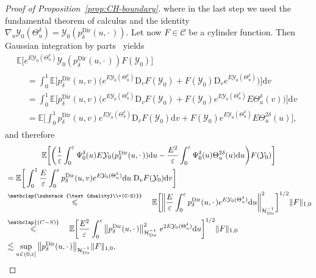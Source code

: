 \documentclass[10pt]{amsart}
\theoremstyle{definition}\newtheorem{defi}[theo]{Definition}\newtheorem{rema}[theo]{Remark}\newtheorem{exam}[theo]{Example}\newtheorem{exem}[theo]{Example}\newtheorem{nota}[theo]{Notation}
\DeclareMathOperator{\Dir}{Dir}
\newcommand{\bb}[1]{{\mathbb #1}}
\newcommand{\mc}[1]{{\mathcal #1}}
\renewcommand{\mc}[1]{{\mathcal #1}}
\newcommand{\mrD}{\mathrm{D}}
\renewcommand{\leq}{\leqslant}
\renewcommand{\le}{\leqslant}
\newcommand*{\dd}{\mathrm{d}}
\newcommand*{\du}{\dd u}
\newcommand*{\dv}{\dd v}
\begin{document}
\begin{proof}[Proof of Proposition~\ref{prop:CH-boundary}]
where in the last step we used the fundamental theorem of calculus and the identity $\nabla_u \mc Y_0(\Theta^\delta_u) = \mc Y_0(p^{\Dir}_\delta(u,\cdot\,))$. Let now $F \in \mc C$ be a cylinder function. Then Gaussian integration by parts~\cite[Lemma~1.2.1]{Nualart2006} yields
\begin{multline*}
\bb E\big[e^{E \mc Y_0(\Theta^\delta_u)} \mc Y_0(p^{\Dir}_\delta(u, \cdot\,)) F(\mc Y_0) \big] \\
\begin{aligned}
& = \int_0^1 \bb E\Big[p^{\Dir}_\delta(u,v) \big(e^{E \mc Y_0(\Theta^\delta_u)} \mrD_vF(\mc Y_0) + F(\mc Y_0) \mrD_v e^{E \mc Y_0(\Theta^\delta_u)} \big) \Big] \dv \\
& = \int_0^1 \bb E\Big[p^{\Dir}_\delta(u,v) \big(e^{E \mc Y_0(\Theta^\delta_u)} \mrD_vF(\mc Y_0) + F(\mc Y_0) e^{E \mc Y_0(\Theta^\delta_u)} E \Theta^\delta_u(v) \big) \Big] \dv \\
& = \bb E\bigg[\int_0^1 p^{\Dir}_\delta(u,v) e^{E \mc Y_0(\Theta^\delta_u)} \mrD_vF(\mc Y_0) \dv+ F(\mc Y_0) e^{E \mc Y_0(\Theta^\delta_u)} E \Theta^{2\delta}_u(u) \bigg],
\end{aligned}
\end{multline*}
and therefore
\begin{multline*}
\bb E\bigg[\bigg(\frac{1}{\varepsilon} \int_0^\varepsilon \Psi^\delta_0 (u) E \mc Y_0(p^{\Dir}_\delta(u,\cdot\,)) \du - \frac{E^2}{\varepsilon} \int_0^\varepsilon \Psi^\delta_0(u) \Theta^{2\delta}_u(u) \du\bigg) F(\mc Y_0) \bigg] \\
\begin{aligned}
&= \bb E\bigg[\int_0^1 \frac{E}{\varepsilon} \int_0^\varepsilon p^{\Dir}_\delta(u,v) e^{E \mc Y_0(\Theta^\delta_u)} \du\; \mrD_vF(\mc Y_0) \dv \bigg] \\
&\overset{\mathclap{\substack{\text{duality}\\+(C-S)}}}{\leq}\quad \bb E\bigg[\bigg\| \frac{E}{\varepsilon} \int_0^\varepsilon p^{\Dir}_\delta(u,\cdot\,) e^{E \mc Y_0(\Theta^\delta_u)} \du \bigg\|_{\mc H_{\Dir}^{- 1}}^2 \bigg]^{1/2} \| F\|_{1,0} \\
&\overset{\mathclap{(C-S)}} \le \quad \bb E\bigg[\frac{E^2}{\varepsilon} \int_0^\varepsilon \big\| p^{\Dir}_\delta(u,\cdot\,)\big\|_{\mc H_{\Dir}^{- 1}}^2 \; e^{2E \mc Y_0(\Theta^\delta_u)} \du \bigg]^{1/2} \| F\|_{1,0} \\
&\lesssim \sup_{u \in (0,\varepsilon]} \big\| p^{\Dir}_\delta(u,\cdot\,)\big\|_{\mc H_{\Dir}^{- 1}} \| F \|_{1,0},
\end{aligned}
\end{multline*}

\end{proof}
\end{document}

